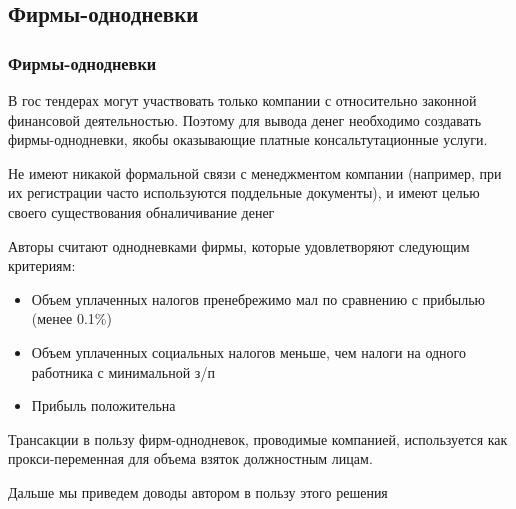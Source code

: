 \subsection{Фирмы-однодневки}

\begin{frame}

\frametitle{Фирмы-однодневки}
В гос тендерах могут участвовать только компании с относительно законной финансовой деятельностью. Поэтому для вывода денег необходимо создавать фирмы-однодневки, якобы оказывающие платные консальтутационные услуги.
\vspace{3mm}

Не имеют никакой формальной связи с менеджментом компании (например, при их регистрации часто используются поддельные документы), и имеют целью своего существования обналичивание денег
\vspace{3mm}
\end{frame}


\begin{frame}
Авторы считают однодневками фирмы, которые удовлетворяют следующим критериям:
\begin{itemize}
\item Объем уплаченных налогов пренебрежимо мал по сравнению с прибылью (менее 0.1\%)
\item Объем уплаченных социальных налогов меньше, чем налоги на одного работника с минимальной з/п
\item Прибыль положительна
\end{itemize}
\vspace{3mm}

Трансакции в пользу фирм-однодневок, проводимые компанией, используется как прокси-переменная для объема взяток должностным лицам. 
\vspace{3mm}

Дальше мы приведем доводы автором в пользу этого решения

\end{frame}
